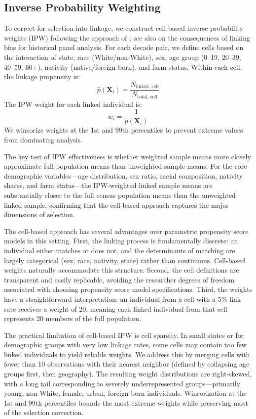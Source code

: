 \documentclass[12pt]{article}
\begin{document}
\subsection{Inverse Probability Weighting}

To correct for selection into linkage, we construct cell-based inverse probability weights (IPW) following the approach of \citet{bailey2020}; see also \citet{mill2020} on the consequences of linking bias for historical panel analysis. For each decade pair, we define cells based on the interaction of state, race (White/non-White), sex, age group (0--19, 20--39, 40--59, 60+), nativity (native/foreign-born), and farm status. Within each cell, the linkage propensity is:
\begin{equation}
\hat{p}(\mathbf{X}_i) = \frac{N_{\text{linked, cell}}}{N_{\text{total, cell}}}
\end{equation}
The IPW weight for each linked individual is:
\begin{equation}
w_i = \frac{1}{\hat{p}(\mathbf{X}_i)}
\end{equation}
We winsorize weights at the 1st and 99th percentiles to prevent extreme values from dominating analysis.

The key test of IPW effectiveness is whether weighted sample means more closely approximate full-population means than unweighted sample means. For the core demographic variables---age distribution, sex ratio, racial composition, nativity shares, and farm status---the IPW-weighted linked sample means are substantially closer to the full census population means than the unweighted linked sample, confirming that the cell-based approach captures the major dimensions of selection.

The cell-based approach has several advantages over parametric propensity score models in this setting. First, the linking process is fundamentally discrete: an individual either matches or does not, and the determinants of matching are largely categorical (sex, race, nativity, state) rather than continuous. Cell-based weights naturally accommodate this structure. Second, the cell definitions are transparent and easily replicable, avoiding the researcher degrees of freedom associated with choosing propensity score model specifications. Third, the weights have a straightforward interpretation: an individual from a cell with a 5\% link rate receives a weight of 20, meaning each linked individual from that cell represents 20 members of the full population.

The practical limitation of cell-based IPW is cell sparsity. In small states or for demographic groups with very low linkage rates, some cells may contain too few linked individuals to yield reliable weights. We address this by merging cells with fewer than 10 observations with their nearest neighbor (defined by collapsing age groups first, then geography). The resulting weight distributions are right-skewed, with a long tail corresponding to severely underrepresented groups---primarily young, non-White, female, urban, foreign-born individuals. Winsorization at the 1st and 99th percentiles bounds the most extreme weights while preserving most of the selection correction.
\end{document}
